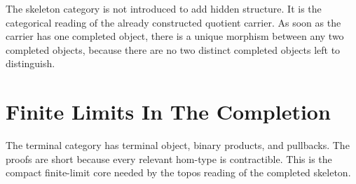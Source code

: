 \documentclass[11pt]{article}
\begin{document}
The skeleton category is not introduced to add hidden structure.  It is
the categorical reading of the already constructed quotient carrier.  As
soon as the carrier has one completed object, there is a unique morphism
between any two completed objects, because there are no two distinct
completed objects left to distinguish.

\section{Finite Limits In The Completion}

The terminal category has terminal object, binary products, and
pullbacks.  The proofs are short because every relevant hom-type is
contractible.  This is the compact finite-limit core needed by the
topos reading of the completed skeleton.
\end{document}
